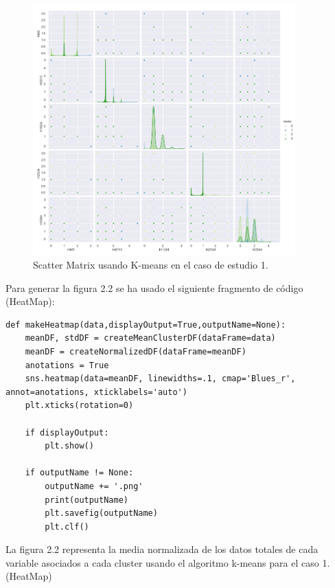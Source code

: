 	\begin{figure}[htb]
		\centering
		\includegraphics[width=0.9\textwidth]{./imagenes/caso1/scatterMatrix_caso1_K-means}
		\caption{Scatter Matrix usando K-means en el caso de estudio 1.} \label{fig:1}
	\end{figure}
	Para generar la figura 2.2 se ha usado el siguiente fragmento de código (HeatMap): \\

	\lstset{language=python}
	\begin{lstlisting}[frame=single]
def makeHeatmap(data,displayOutput=True,outputName=None):
	meanDF, stdDF = createMeanClusterDF(dataFrame=data)
	meanDF = createNormalizedDF(dataFrame=meanDF)
	anotations = True
	sns.heatmap(data=meanDF, linewidths=.1, cmap='Blues_r', annot=anotations, xticklabels='auto')
	plt.xticks(rotation=0)

	if displayOutput:
		plt.show()

	if outputName != None:
		outputName += '.png'
		print(outputName)
		plt.savefig(outputName)
		plt.clf()
	\end{lstlisting}

	La figura 2.2 representa la media normalizada de los datos totales de cada variable asociados
	a cada cluster usando el algoritmo k-means para el caso 1. (HeatMap) \\

